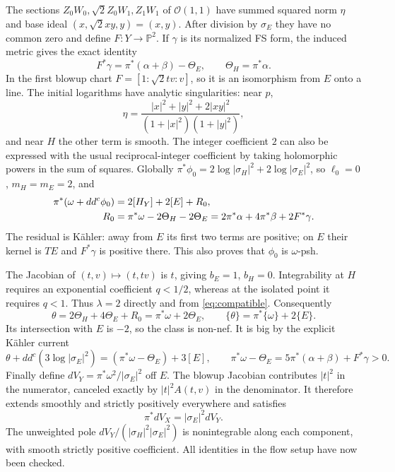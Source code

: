\documentclass[11pt]{article}
\newcommand{\ddc}{dd^c}
\newcommand{\CP}{\mathbb P}
\begin{document}
The sections $Z_0W_0,\sqrt2Z_0W_1,Z_1W_1$ of $\mathcal O(1,1)$
have summed squared norm $\eta$ and base ideal $(x,\sqrt2xy,y)=(x,y)$.
After division by $\sigma_E$ they have no common zero and define
$F:Y\to\CP^2$. If $\gamma$ is its normalized FS form, the induced
metric gives the exact identity
\begin{equation}\label{eq:curvatures}
 F^*\gamma=\pi^*(\alpha+\beta)-\Theta_E,\qquad
 \Theta_H=\pi^*\alpha.
\end{equation}
In the first blowup chart $F=[1:\sqrt2tv:v]$, so it is an
isomorphism from $E$ onto a line.
The initial logarithms have analytic singularities: near $p$,
\[
 \eta=\frac{|x|^2+|y|^2+2|xy|^2}{(1+|x|^2)(1+|y|^2)},
\]
and near $H$ the other term is smooth. The integer coefficient $2$
can also be expressed with the usual reciprocal-integer coefficient
by taking holomorphic powers in the sum of squares.
Globally $\pi^*\phi_0=2\log|\sigma_H|^2+2\log|\sigma_E|^2$,
so $\ell_0=0$, $m_H=m_E=2$, and
\begin{align}\label{eq:residual}
 \pi^*(\omega+\ddc\phi_0)&=2[H_Y]+2[E]+R_0,\\
 R_0&=\pi^*\omega-2\Theta_H-2\Theta_E
      =2\pi^*\alpha+4\pi^*\beta+2F^*\gamma.\notag
\end{align}
The residual is K\"ahler: away from $E$ its first two terms are
positive; on $E$ their kernel is $TE$ and $F^*\gamma$ is positive
there. This also proves that $\phi_0$ is $\omega$-psh.

The Jacobian of $(t,v)\mapsto(t,tv)$ is $t$, giving
$b_E=1$, $b_H=0$. Integrability at $H$ requires an exponential
coefficient $q<1/2$, whereas at the isolated point it requires $q<1$.
Thus $\lambda=2$ directly and from \eqref{eq:compatible}.
Consequently
\begin{equation}\label{eq:theta}
 \theta=2\Theta_H+4\Theta_E+R_0=\pi^*\omega+2\Theta_E,
 \qquad\{\theta\}=\pi^*\{\omega\}+2\{E\}.
\end{equation}
Its intersection with $E$ is $-2$, so the class is non-nef.
It is big by the explicit K\"ahler current
\[
 \theta+\ddc(3\log|\sigma_E|^2)
           =(\pi^*\omega-\Theta_E)+3[E],\qquad
 \pi^*\omega-\Theta_E=5\pi^*(\alpha+\beta)+F^*\gamma>0.
\]
Finally define $dV_Y=\pi^*\omega^2/|\sigma_E|^2$ off $E$.
The blowup Jacobian contributes $|t|^2$ in the numerator, canceled
exactly by $|t|^2A(t,v)$ in the denominator. It therefore extends
smoothly and strictly positively everywhere and satisfies
\begin{equation}\label{eq:volume}
 \pi^*dV_X=|\sigma_E|^2dV_Y.
\end{equation}
The unweighted pole $dV_Y/(|\sigma_H|^2|\sigma_E|^2)$ is
nonintegrable along each component, with smooth strictly positive
coefficient. All identities in the flow setup have now been checked.
\end{document}
